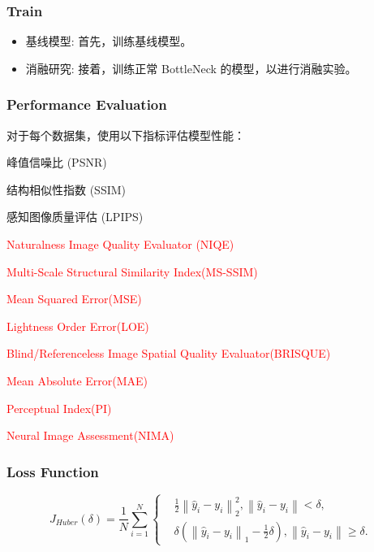 \documentclass[a4paper]{ctexart}
\begin{document}
		\subsubsection{Train}
		
		\begin{itemize}
			\item [$\bullet$]
			基线模型: 首先，训练基线模型。
			
			\item [$\bullet$]
			消融研究: 接着，训练正常 BottleNeck 的模型，以进行消融实验。
		\end{itemize}
		
		\subsubsection{Performance Evaluation}
		
		对于每个数据集，使用以下指标评估模型性能：
		
		\begin{itemize}
			\item[$\bullet$]
			峰值信噪比 (PSNR)
			\item[$\bullet$]
			结构相似性指数 (SSIM)
			\item[$\bullet$]
			感知图像质量评估 (LPIPS)
			\textcolor{red}{
			\item[$\bullet$] 
			Naturalness Image Quality Evaluator (NIQE)
			\item[$\bullet$]
			Multi-Scale Structural Similarity Index(MS-SSIM)
			\item[$\bullet$]
			Mean Squared Error(MSE)
			\item[$\bullet$]
			Lightness Order Error(LOE)
			\item[$\bullet$]
			Blind/Referenceless Image Spatial Quality Evaluator(BRISQUE)
			\item[$\bullet$]
			Mean Absolute Error(MAE)
			\item[$\bullet$]
			Perceptual Index(PI)
			\item[$\bullet$]
			Neural Image Assessment(NIMA)
			}
		\end{itemize}
				
		\subsubsection{Loss Function}
		
		\begin{equation}
			J_{Huber}(\delta)= \frac{1}{N}\sum_{i=1}^{N}
			\left\{
			\begin{aligned}
				&\frac{1}{2}{\left\|\hat{y}_i - y_i \right\|}_2^{2}, \left\| \hat{y}_i -y_i \right\| < \delta , \\
				&\delta\left({\left\|\hat{y}_i - y_i \right\|}_1 - \frac{1}{2}\delta \right), \left\| \hat{y}_i -y_i \right\| \geq \delta.
			\end{aligned}
			\right.
			\label{eq: huber loss}
		\end{equation}
		
\end{document}
